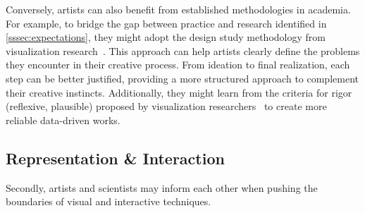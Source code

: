 Conversely, artists can also benefit from established methodologies in academia. For example, to bridge the gap between practice and research identified in \autoref{sssec:expectations}, they might adopt the design study methodology from visualization research~\cite{sedlmair2012design}. This approach can help artists clearly define the problems they encounter in their creative process. From ideation to final realization, each step can be better justified, providing a more structured approach to complement their creative instincts. Additionally, they might learn from the criteria for rigor (\eg reflexive, plausible) proposed by visualization researchers~\cite{meyer2019criteria} to create more reliable data-driven works.



\subsection{Representation \& Interaction}

Secondly, artists and scientists may inform each other when pushing the boundaries of visual and interactive techniques.

